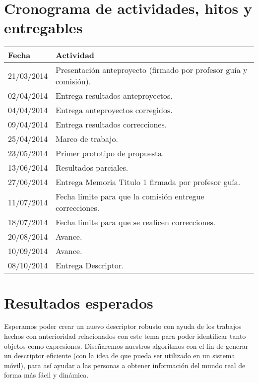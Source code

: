 \documentclass[a4paper,12pt]{article}
\begin{document}
\section{Cronograma de actividades, hitos y entregables}
\begin{tabular}{ll}
\hline\noalign{\smallskip}
Fecha & Actividad \\
\hline\noalign{\smallskip}
21/03/2014 & Presentación anteproyecto (firmado por profesor guía y comisión).\\

02/04/2014 & Entrega resultados anteproyectos.\\

04/04/2014 & Entrega anteproyectos corregidos.\\

09/04/2014 &  Entrega resultados correcciones.\\

25/04/2014 & Marco de trabajo.\\

23/05/2014 & Primer prototipo de propuesta.\\

13/06/2014 & Resultados parciales.\\

27/06/2014 & Entrega Memoria Titulo 1 firmada por profesor guía.\\

11/07/2014 & Fecha límite para que la comisión entregue correcciones.\\

18/07/2014 & Fecha límite para que se realicen correcciones.\\

20/08/2014 & Avance.\\

10/09/2014 & Avance.\\

08/10/2014 & Entrega Descriptor.\\


\hline

\end{tabular}
\section{Resultados esperados}
Esperamos poder crear un nuevo descriptor robusto con ayuda de los trabajos hechos con anterioridad relacionados con este tema para poder identificar tanto objetos como expresiones. Diseñaremos nuestros algoritmos con el fin de generar un descriptor eficiente (con la idea de que pueda ser utilizado en un sistema móvil), para así ayudar a las personas a obtener información del mundo real de forma más fácil y dinámica.
\end{document}
